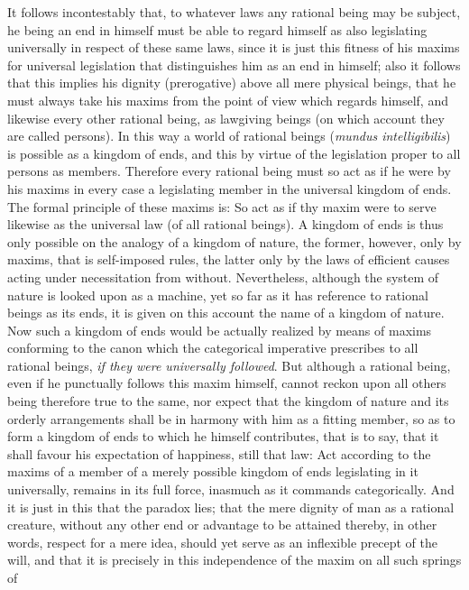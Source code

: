 It follows incontestably that, to whatever laws any rational being may
be subject, he being an end in himself must be able to regard himself
as also legislating universally in respect of these same laws, since
it is just this fitness of his maxims for universal legislation that
distinguishes him as an end in himself;  also it follows that
this implies his dignity (prerogative) above all mere physical beings,
that he must always take his maxims from the point of view which
regards himself, and likewise every other rational being, as lawgiving
beings (on which account they are called persons). In this way a world
of rational beings (\textit{mundus intelligibilis}) is possible as a
kingdom of ends, and this by virtue of the legislation proper to all
persons as members. Therefore every rational being must so act as if
he were by his maxims in every case a legislating member in the
universal kingdom of ends. The formal principle of these maxims is: So
act as if thy maxim were to serve likewise as the universal law (of
all rational beings). A kingdom of ends is thus only possible on the
analogy of a kingdom of nature, the former, however, only by maxims,
that is self-imposed rules, the latter only by the laws of efficient
causes acting under necessitation from without. Nevertheless, although
the system of nature is looked upon as a machine, yet so far as it has
reference to rational beings as its ends, it is given on this account
the name of a kingdom of nature. Now such a kingdom of ends would be
actually realized by means of maxims conforming to the canon which the
categorical imperative prescribes to all rational beings, \textit{if
they were universally followed}. But although a rational being, even
if he punctually follows this maxim himself, cannot reckon upon all
others being therefore true to the same, nor expect that the kingdom
of nature and its orderly arrangements shall be in harmony with him as
a fitting member, so as to form a kingdom of ends to which he himself
contributes, that is to say, that it shall favour his expectation of
happiness, still that law: Act according to the maxims of a member of
a merely possible kingdom of ends legislating in it universally,
remains in its full force, inasmuch as it commands categorically. And
it is just in this that the paradox lies; that the mere dignity of man
as a rational creature, without any other end or advantage to be
attained thereby, in other words, respect for a mere idea, should yet
serve as an inflexible precept of the will, and that it is precisely
in this independence of the maxim on all such springs of 
